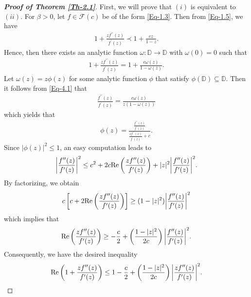 \documentclass[a4paper,12pt]{amsart}
\theoremstyle{plain}
\theoremstyle{definition}
\theoremstyle{plain}
\begin{document}
\begin{proof}[\bf Proof of Theorem \ref{Th-2.1}]
	First, we will prove that $(i)$ is equivalent to $(ii)$. For $\beta>0$, let  $f\in\mathcal{F}(c)$ be of the form \eqref{Eq-1.3}. Then from \eqref{Eq-1.5}, we have
	\begin{align}\label{Eq-4.1}
		1+\frac{zf^{\prime\prime}(z)} {f^{\prime}(z)}\prec1+\frac{cz}{1-z}.
	\end{align}
	\noindent Hence, then there exists an analytic function $\omega: \mathbb{D}\rightarrow\mathbb{D}$ with $\omega(0)=0$ such that
	\begin{align*}
		1+\frac{zf^{\prime\prime}(z)} {f^{\prime}(z)}=1+\frac{c\omega(z)}{1-\omega(z)}.
	\end{align*}
	Let $\omega(z)=z\phi(z)$ for some analytic function $\phi$ that satisfy $\phi(\mathbb{D})\subseteq\mathbb{D}$. Then it follows from \eqref{Eq-4.1} that
	\begin{align*}
		\frac{f^{\prime\prime}(z)}{f^{\prime}(z)}=\frac{c\omega(z)}{z(1-\omega(z))}
	\end{align*}
	which yields that
	\begin{align}\label{Eq-2.3}
		\phi(z)=\frac{\frac{f^{\prime\prime}(z)}{f^{\prime}(z)}}{\frac{zf^{\prime\prime}(z)}{f^{\prime}(z)}+c}.
	\end{align}
	Since $|\phi(z)|^2\leq1$, an easy computation leads to
	\begin{align}\label{Eq-2.4}
		\bigg|\frac{f^{\prime\prime}(z)}{f^{\prime}(z)}\bigg|^2\leq c^2+2c	{\rm Re}\left(\frac{zf^{\prime\prime}(z)}{f^{\prime}(z)}\right)+|z|^2\bigg|\frac{f^{\prime\prime}(z)}{f^{\prime}(z)}\bigg|^2.
	\end{align}
	By factorizing, we obtain
	\begin{align*}
		\nonumber c\left[c+2{\rm Re}\left(\frac{zf^{\prime\prime}(z)}{f^{\prime}(z)}\right)\right]\ge(1-|z|^2)\bigg|\frac{f^{\prime\prime}(z)}{f^{\prime}(z)}\bigg|^2
	\end{align*}
	which implies that
	\begin{align}
		{\rm Re}\left(\frac{zf^{\prime\prime}(z)}{f^{\prime}(z)}\right)\geq-\frac{c}{2}+\left(\frac{1-|z|^2}{2c}\right)\bigg|\frac{f^{\prime\prime}(z)}{f^{\prime}(z)}\bigg|^2.
	\end{align}
	Consequently, we have the desired inequality
	\begin{align*}
		{\rm Re  }\left(1+\frac{zf^{\prime\prime}(z)}{f^{\prime}(z)}\right)\leq1-\frac{c}{2}+\left(\frac{1-|z|^2}{2c}\right)\bigg|\frac{zf^{\prime\prime}(z)}{f^{\prime}(z)}\bigg|^2.
	\end{align*}
	

\end{proof}
\end{document}
